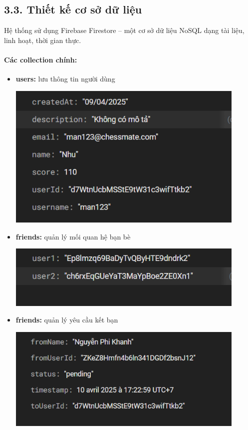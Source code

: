 \documentclass[a4paper,12pt]{article}
\begin{document}
\subsection*{3.3. Thiết kế cơ sở dữ liệu} %

\justify
\noindent Hệ thống sử dụng Firebase Firestore – một cơ sở dữ liệu NoSQL dạng tài liệu, linh hoạt, thời gian thực.

\paragraph{Các collection chính:} %

\begin{itemize}[label=·]
    \item \textbf{users:} lưu thông tin người dùng
          \begin{center}
              \includegraphics[width=0.9\textwidth]{img/user.png}
          \end{center}
    \item \textbf{friends:} quản lý mối quan hệ bạn bè
          \begin{center}
              \includegraphics[width=0.9\textwidth]{img/friend.png}
          \end{center}
     \item \textbf{friends:} quản lý yêu cầu kết bạn
          \begin{center}
              \includegraphics[width=0.9\textwidth]{img/friend_request.png}

\end{center}
\end{itemize}
\end{document}
